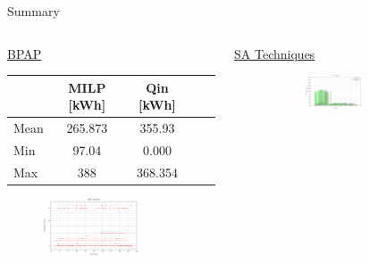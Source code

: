 \documentclass[aspectratio=169,dvipsnames]{beamer}
\begin{document}
\begin{frame}[label={sec:orgc246b89}]{Summary}
\begin{columns}
\begin{column}{0.5\columnwidth}
\begin{center} {\small \underline{BPAP}}\end{center}

{\small
\begin{center}
\begin{tabular}{l|cccc}
\hline
 & MILP [kWh] & Qin [kWh]\\[0pt]
\hline
Mean & 265.873 & 355.93\\[0pt]
Min & 97.04 & 0.000\\[0pt]
Max & 388 & 368.354\\[0pt]
\hline
\end{tabular}
\end{center}
}

\begin{figure}[htpb]
\centering
    \includegraphics[width=0.7\textwidth]{img/milp-pap/schedule-milp-pap}
\end{figure}
\end{column}

\begin{column}{0.5\columnwidth}
\begin{center} {\small \underline{SA Techniques}}\end{center}

\begin{figure}[htpb]
\begin{subfigure}[t]{\textwidth}
\centering
    \includegraphics[width=0.7\textwidth]{img/sa-pap-paper-good/power-sa}
\end{subfigure}


\end{figure}
\end{column}
\end{columns}
\end{frame}
\end{document}
